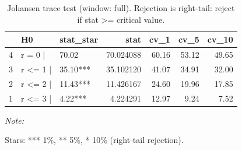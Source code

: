 \begin{table}[!h]
\centering
\caption{Johansen trace test (window: full). Rejection is right-tail: reject if stat >= critical value.}
\centering
\begin{threeparttable}
\begin{tabular}[t]{lllrrrr}
\toprule
  & H0 & stat\_star & stat & cv\_1 & cv\_5 & cv\_10\\
\midrule
4 & r = 0  | & 70.02 & 70.024088 & 60.16 & 53.12 & 49.65\\
3 & r <= 1 | & 35.10*** & 35.102120 & 41.07 & 34.91 & 32.00\\
2 & r <= 2 | & 11.43*** & 11.426167 & 24.60 & 19.96 & 17.85\\
1 & r <= 3 | & 4.22*** & 4.224291 & 12.97 & 9.24 & 7.52\\
\bottomrule
\end{tabular}
\begin{tablenotes}
\item \textit{Note: } 
\item Stars: *** 1\%, ** 5\%, * 10\% (right-tail rejection).
\end{tablenotes}
\end{threeparttable}
\end{table}
